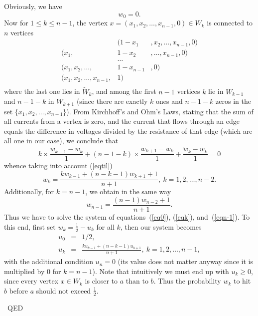 \documentclass[12pt]{article}
\newenvironment{proof}{{\sc Proof:}}{~\hfill QED}
\begin{document}
\begin{proof}
Obviously, we have
\begin{equation}\label{eq0}
w_0=0.
\end{equation}
Now for $1\le k \le n-1$, the vertex
$x=(x_1,x_2,\dots,x_{n-1},0)\in W_k$ is connected to $n$ vertices
\begin{eqnarray*}
 &(1-x_1&,x_2,\dots,x_{n-1},0)\\
 (x_1,&1- x_2&,\dots,x_{n-1},0)\\
 &\dots&\\
 (x_1,x_2,\dots,&1-x_{n-1}&,0)\\
 (x_1,x_2,\dots,x_{n-1},&1)&\\
\end{eqnarray*}
where the last one lies in $\tilde W_k$, and among the first $n-1$
vertices $k$ lie in $W_{k-1}$ and $n-1-k$ in $W_{k+1}$ (since
there are exactly $k$ ones and $n-1-k$ zeros in the set
$\{x_1,x_2,\dots,x_{n-1}\}$). From Kirchhoff's and Ohm's Laws,
stating that the sum of all currents from a vertex is zero, and
the current that flows through an edge equals the difference in
voltages divided by the resistance of that edge (which are all one
in our case), we conclude that
$$
 k\times\frac{w_{k-1}-w_k}1+(n-1-k)\times\frac{w_{k+1}-w_k}1+ \frac{\tilde w_k-w_k}1 =0
$$
whence taking into account (\ref{eqtil})
\begin{equation}\label{eqk}
 w_k=\frac{k w_{k-1}+(n-k-1)w_{k+1}+1}{n+1}, \ k=1,2,\dots,n-2.
\end{equation}
Additionally, for $k=n-1$, we obtain in the same way
\begin{equation}\label{eqn-1}
 w_{n-1}=\frac{(n-1)w_{n-2}+1}{n+1}.
\end{equation}
Thus we have to solve the system of equations~(\ref{eq0}),
(\ref{eqk}), and~(\ref{eqn-1}). To this end, first set $w_k=\frac
12-u_k$ for all $k$, then our system becomes
\begin{eqnarray}\label{equ}
 u_0&=&1/2,\\
 u_k&=&\frac{k u_{k-1}+(n-k-1)u_{k+1}}{n+1}, \ k=1,2,\dots,n-1,
 \nonumber
\end{eqnarray}
with the additional condition $u_{n}=0$ (its value does not matter
anyway since it is multiplied by $0$ for $k=n-1$). Note that
intuitively we must end up with $u_k\ge 0$, since every vertex
$x\in W_k$ is closer to $a$ than to $b$. Thus the probability
$w_k$ to hit $b$ before $a$ should not exceed $\frac 12$.


\end{proof}
\end{document}
